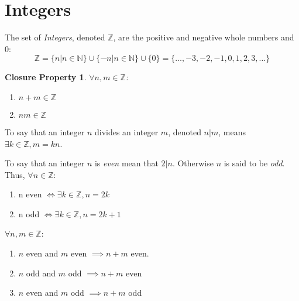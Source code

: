 \documentclass[letterpaper,12pt,fleqn]{article}
\begin{document}
\section*{Integers}

\begin{definition}
The set of \emph{Integers}, denoted $\mathbb{Z}$, are the positive and negative
whole numbers and 0:
\[\mathbb{Z}=\{n|n\in\mathbb{N}\}\cup\{-n|n\in\mathbb{N}\}\cup\{0\}=
    \{\ldots, -3, -2, -1, 0, 1, 2, 3, \ldots\}\]
\end{definition}

\theoremstyle{mathitem}
\newtheorem*{closure}{Closure Property}
\begin{closure}
$\forall n,m\in\mathbb{Z}$:
\begin{enumerate}
\item{$n+m\in\mathbb{Z}$}
\item{$nm\in\mathbb{Z}$}
\end{enumerate}
\end{closure}

\begin{definition}
To say that an integer $n$ divides an integer $m$, denoted $n|m$, means
$\exists k\in\mathbb{Z},m=kn$.
\end{definition}

\begin{definition}
To say that an integer $n$ is \emph{even} mean that $2|n$. Otherwise $n$ is
said to be \emph{odd}. Thus, $\forall n\in\mathbb{Z}$:
\begin{enumerate}
\item{n even $\iff\exists k\in\mathbb{Z},n=2k$}
\item{n odd $\iff\exists k\in\mathbb{Z},n=2k+1$}
\end{enumerate}
\end{definition}

\begin{theorem}
$\forall n,m\in\mathbb{Z}$:
\begin{enumerate}
\item{$n$ even and $m$ even $\implies n+m$ even.}
\item{$n$ odd and $m$ odd $\implies n+m$ even}
\item{$n$ even and $m$ odd $\implies n+m$ odd}
\end{enumerate}
\end{theorem}
\end{document}

